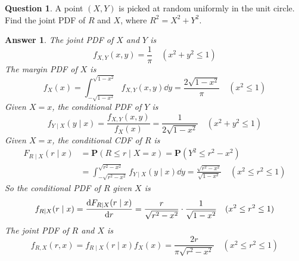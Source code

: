 \documentclass[utf8]{article}
\theoremstyle{definition}%
\newtheorem{question}{Question} %
\theoremstyle{plain}%
\newtheorem{answer}{Answer} %
\begin{document}
\begin{question}
    A point $(X, Y)$ is picked at random uniformly in the unit circle. Find the joint PDF of $R$ and $X$, where $R^2 = X^2 + Y^2$.
\end{question}
\begin{answer}
    The joint PDF of $X$ and $Y$ is
    \begin{equation}
        f_{X, Y}(x, y) = \frac{1}{\pi} \quad (x^2 + y^2 \leq 1)
    \end{equation}
    The margin PDF of $X$ is
    \begin{equation}
        f_{X}(x) = \int_{-\sqrt{1 - x^2}}^{\sqrt{1 - x^2}} f_{X, Y}(x, y) \dd{y} = \frac{2\sqrt{1 - x^2}}{\pi} \quad (x^2 \leq 1)
    \end{equation}
    Given $X = x$, the conditional PDF of $Y$ is
    \begin{equation}
        f_{Y \mid X}(y \mid x) = \frac{f_{X, Y}(x, y)}{f_{X}(x)} = \frac{1}{2\sqrt{1 - x^2}} \quad (x^2 + y^2 \leq 1)
    \end{equation}
    Given $X = x$, the conditional CDF of $R$ is 
    \begin{equation}
    \begin{aligned}
        F_{R \mid X}(r \mid x) &= \mathbf{P}(R \leq r \mid X = x) = \mathbf{P}(Y^2 \leq r^2 - x^2) \\ 
        &= \int_{-\sqrt{r^2 - x^2}}^{\sqrt{r^2 - x^2}} f_{Y \mid X}(y \mid x) \dd{y} = \frac{\sqrt{r^2 - x^2}}{\sqrt{1 - x^2}} \quad (x^2 \leq r^2 \leq 1)
    \end{aligned}
    \end{equation}
    So the conditional PDF of $R$ given $X$ is
    \begin{equation}
        f_{R \mid X}(r \mid x) = \dv{F_{R \mid X}(r \mid x)}{r} = \frac{r}{\sqrt{r^2 - x^2}} \cdot \frac{1}{\sqrt{1 - x^2}} \quad (x^2 \leq r^2 \leq 1)
    \end{equation}
    The joint PDF of $R$ and $X$ is
    \begin{equation}
        f_{R, X}(r, x) = f_{R \mid X}(r \mid x) f_{X}(x) = \frac{2r}{\pi\sqrt{r^2 - x^2}} \quad (x^2 \leq r^2 \leq 1)
    \end{equation}
\end{answer}
\end{document}
